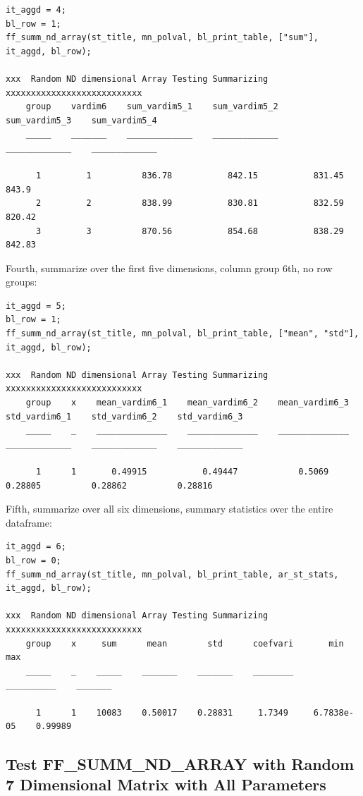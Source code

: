 \documentclass[
]{book}
\begin{document}
\begin{verbatim}
it_aggd = 4; 
bl_row = 1; 
ff_summ_nd_array(st_title, mn_polval, bl_print_table, ["sum"], it_aggd, bl_row);

xxx  Random ND dimensional Array Testing Summarizing  xxxxxxxxxxxxxxxxxxxxxxxxxxx
    group    vardim6    sum_vardim5_1    sum_vardim5_2    sum_vardim5_3    sum_vardim5_4
    _____    _______    _____________    _____________    _____________    _____________

      1         1          836.78           842.15           831.45            843.9    
      2         2          838.99           830.81           832.59           820.42    
      3         3          870.56           854.68           838.29           842.83    
\end{verbatim}

Fourth, summarize over the first five dimensions, column group 6th, no
row groups:

\begin{verbatim}
it_aggd = 5;
bl_row = 1; 
ff_summ_nd_array(st_title, mn_polval, bl_print_table, ["mean", "std"], it_aggd, bl_row);

xxx  Random ND dimensional Array Testing Summarizing  xxxxxxxxxxxxxxxxxxxxxxxxxxx
    group    x    mean_vardim6_1    mean_vardim6_2    mean_vardim6_3    std_vardim6_1    std_vardim6_2    std_vardim6_3
    _____    _    ______________    ______________    ______________    _____________    _____________    _____________

      1      1       0.49915           0.49447            0.5069           0.28805          0.28862          0.28816   
\end{verbatim}

Fifth, summarize over all six dimensions, summary statistics over the
entire dataframe:

\begin{verbatim}
it_aggd = 6;
bl_row = 0; 
ff_summ_nd_array(st_title, mn_polval, bl_print_table, ar_st_stats, it_aggd, bl_row);

xxx  Random ND dimensional Array Testing Summarizing  xxxxxxxxxxxxxxxxxxxxxxxxxxx
    group    x     sum      mean        std      coefvari       min          max  
    _____    _    _____    _______    _______    ________    __________    _______

      1      1    10083    0.50017    0.28831     1.7349     6.7838e-05    0.99989
\end{verbatim}

\hypertarget{test-ff_summ_nd_array-with-random-7-dimensional-matrix-with-all-parameters}{%
\subsection{Test FF\_SUMM\_ND\_ARRAY with Random 7 Dimensional Matrix with All Parameters}\label{test-ff_summ_nd_array-with-random-7-dimensional-matrix-with-all-parameters}}
\end{document}
